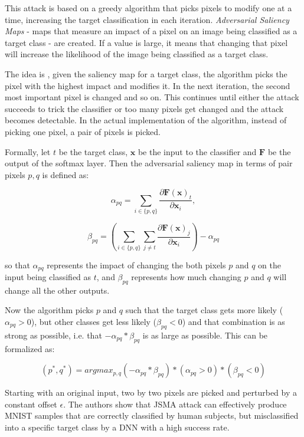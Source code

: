 This attack is based on a greedy algorithm that picks pixels to modify one at a time, increasing the target classification in each iteration.  \textit{Adversarial Saliency Maps} - maps that measure an impact of a pixel on an image being classified as a target class - are created. If a value is large, it means that changing that pixel will increase the likelihood of the image being classified as a target class. 

The idea is , given the saliency map for a target class, the algorithm picks the pixel with the highest impact and modifies it. In the next iteration, the second most important pixel is changed and so on. This continues until either the attack succeeds to trick the classifier or too many pixels get changed and the attack becomes detectable. In the actual implementation of the algorithm, instead of picking one pixel, a pair of pixels is picked.

Formally, let $t$ be the target class, $\pmb x$ be the input to the classifier and $\pmb F$ be the output of the softmax layer. Then the adversarial saliency map in terms of pair pixels $p, q$ is defined as:

\[
\alpha_{pq} = \sum_{i \in \{p,q\}} \frac{\partial \pmb F(\pmb x)_t}{\partial \pmb x_i},
\]

\[
\beta_{pq} = ( \sum_{i \in \{p,q\}} \sum_{j \neq t} \frac{\partial \pmb F (\pmb x)_j }{\partial \pmb x _i}) - \alpha_{pq}
\]

so that $\alpha_{pq}$ represents the impact of changing the both pixels $p$ and $q$ on the input being classified as $t$, and $\beta_{pq}$ represents how
much changing $p$ and $q$ will change all the other outputs.

Now the algorithm picks $p$ and $q$ such that the target class gets more likely ( $\alpha_{pq} > 0$), but other classes get less likely ($\beta_{pq} < 0$) and that combination is as strong as possible, i.e. that $ - \alpha_{pq} * \beta_{pq}$ is as large as possible. This can be formalized as:

\[
(p^*, q^*) = arg max_{p, q} (- \alpha_{pq} * \beta_{pq}) * (\alpha_{pq} > 0) * (\beta_{pq} < 0)
\]

Starting with an original input, two by two pixels are picked and perturbed by a constant offset $\epsilon$. The authors \cite{DBLP:journals/corr/PapernotMJFCS15}show that JSMA attack can effectively produce MNIST samples that are correctly classified by human subjects, but misclassified into a specific target class by a DNN with a high success rate. 